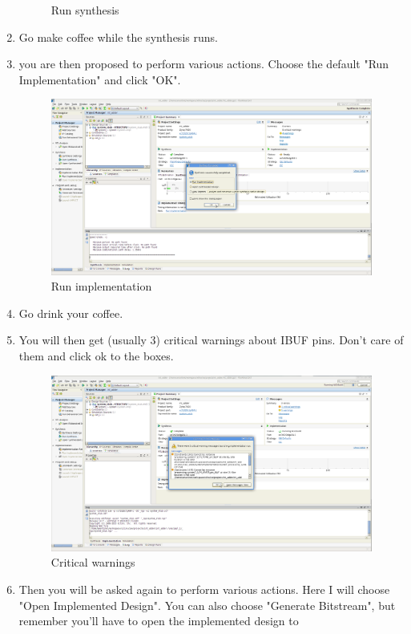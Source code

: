\documentclass{article}
\begin{document}
\begin{enumerate}
\begin{figure}
	\caption{Run synthesis}
	\end{figure}
		\item Go make coffee while the synthesis runs.
		\item you are then proposed to perform various actions. Choose the
		default "Run Implementation" and click "OK".
	\begin{figure}
	\includegraphics[scale=0.25]{pictures/SynthesisComplete.png}
	\caption{Run implementation}
	\end{figure}
		\item Go drink your coffee.
		\item You will then get (usually 3) critical warnings about IBUF pins.
		Don't care of them and click ok to the boxes.
	\begin{figure}
	\includegraphics[scale=0.25]{pictures/CriticalWarnings.png}
	\caption{Critical warnings}
	\end{figure}
		\item Then you will be asked again to perform various actions. Here I
		will choose "Open Implemented Design". You can also choose "Generate
		Bitstream", but remember you'll have to open the implemented design to

\end{enumerate}
\end{document}
